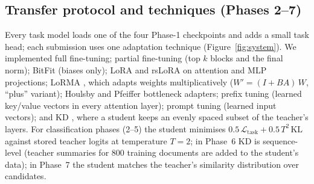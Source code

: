 \documentclass[11pt]{article}
\begin{document}
\subsection{Transfer protocol and techniques (Phases 2--7)}
Every task model loads one of the four Phase-1 checkpoints and adds a small task head; each submission uses one adaptation technique (Figure~\ref{fig:system}). We implemented full fine-tuning; partial fine-tuning (top $k$ blocks and the final norm); BitFit \cite{benzaken2022bitfit} (biases only); LoRA \cite{hu2021lora} and rsLoRA \cite{kalajdzievski2023rslora} on attention and MLP projections; LoRMA \cite{bihany2025lorma}, which adapts weights multiplicatively ($W' = (I + BA)\,W$, ``plus'' variant); Houlsby \cite{houlsby2019parameter} and Pfeiffer \cite{pfeiffer2021adapterfusion} bottleneck adapters; prefix tuning \cite{li2021prefix} (learned key/value vectors in every attention layer); prompt tuning \cite{lester2021power} (learned input vectors); and KD \cite{hinton2015distilling}, where a student keeps an evenly spaced subset of the teacher's layers. For classification phases (2--5) the student minimises $0.5\,\mathcal{L}_{\text{task}} + 0.5\,T^2\,\mathrm{KL}$ against stored teacher logits at temperature $T=2$; in Phase~6 KD is sequence-level (teacher summaries for 800 training documents are added to the student's data); in Phase~7 the student matches the teacher's similarity distribution over candidates.
\end{document}

